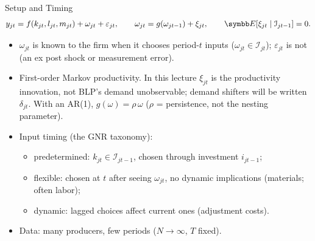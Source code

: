 \documentclass[aspectratio=169,10pt]{beamer}
\begin{document}
\begin{frame}{Setup and Timing}
\begin{align*}
y_{jt} = f(k_{jt}, l_{jt}, m_{jt}) + \omega_{jt} + \varepsilon_{jt}, \qquad
\omega_{jt} = g(\omega_{jt-1}) + \xi_{jt}, \qquad \E[\xi_{jt} \mid \mathcal{I}_{jt-1}] = 0.
\end{align*}
\begin{itemize}
\item $\omega_{jt}$ is known to the firm when it chooses period-$t$ inputs ($\omega_{jt} \in \mathcal{I}_{jt}$); $\varepsilon_{jt}$ is not (an ex post shock or measurement error).
\item First-order Markov productivity. In this lecture \alert{$\xi_{jt}$ is the productivity innovation}, not BLP's demand unobservable; demand shifters will be written $\delta_{jt}$. With an AR(1), $g(\omega) = \rho\,\omega$ ($\rho$ = persistence, not the nesting parameter).
\item Input timing (the GNR taxonomy):
\begin{itemize}
\item \alert{predetermined}: $k_{jt} \in \mathcal{I}_{jt-1}$, chosen through investment $i_{jt-1}$;
\item \alert{flexible}: chosen at $t$ after seeing $\omega_{jt}$, no dynamic implications (materials; often labor);
\item \alert{dynamic}: lagged choices affect current ones (adjustment costs).
\end{itemize}
\item Data: many producers, few periods ($N \to \infty$, $T$ fixed).
\end{itemize}
\end{frame}
\end{document}
